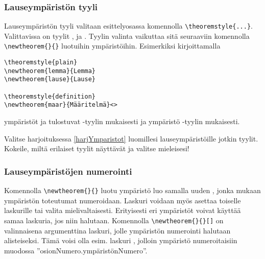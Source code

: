 
\begin{fframe}
    \frametitle{Lauseympäristön tyyli}
    Lauseympäristön tyyli valitaan esittelyosassa komennolla \lstinline-\theoremstyle{...}-. Valittavissa on tyylit ,  ja . Tyylin valinta vaikuttaa sitä seuraaviin komennolla \lstinline-\newtheorem{}{}- luotuihin ympäristöihin.
    \vaihto
    Esimerkiksi kirjoittamalla
    \pause
    \begin{lstlisting}
\theoremstyle{plain}
\newtheorem{lemma}{Lemma}
\newtheorem{lause}{Lause}

\theoremstyle{definition}
\newtheorem{maar}{Määritelmä}<>
    \end{lstlisting}
    \pause
    ympäristöt  ja  tulostuvat -tyylin mukaisesti ja ympäristö  -tyylin mukaisesti.
\end{fframe}

\begin{fframe}
    \begin{harj}
        Valitse harjoituksessa \ref{harjYmparistot} luomillesi lauseympäristöille jotkin tyylit. Kokeile, miltä erilaiset tyylit näyttävät ja valitse mieleisesi!
    \end{harj}
\end{fframe}

\begin{fframe}
    \frametitle{Lauseympäristöjen numerointi}
    Komennolla \lstinline-\newtheorem{}{}- luotu ympäristö luo samalla uuden , jonka mukaan ympäristön toteutumat numeroidaan. 
    \vaihto
    Laskuri voidaan myös asettaa toiselle laskurille  tai valita mielivaltaisesti. Erityisesti eri ympäristöt voivat käyttää samaa laskuria, jos niin halutaan.
    \vaihto
    Komennolla \lstinline-\newtheorem{}{}[]- on valinnaisena argumenttina laskuri, jolle ympäristön numerointi halutaan alisteiseksi. Tämä voisi olla esim. laskuri , jolloin ympäristö numeroitaisiin muodossa ''osionNumero.ympäristönNumero''.
\end{fframe}

